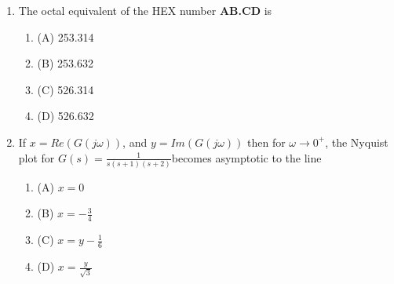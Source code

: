 \documentclass[journal]{IEEEtran}
\numberwithin{equation}{enumi}
\numberwithin{figure}{enumi}
\begin{document}
\begin{enumerate}
\begin{figure}[!ht]
    \caption{}
    \label{fig:15}
    \end{figure}
    \\\\The bus voltage phase angular difference between generator bus X and generator bus Y after the interconnection is
    \begin{multicols}{4}
    \begin{enumerate}
        \item $10^\circ$
        \item $25^\circ$
        \item $-30^\circ$
        \item $30^\circ$
    \end{enumerate}
    \end{multicols}
    \bigskip
    \item The octal equivalent of the HEX number \textbf{AB.CD} is
    \begin{multicols}{4}
    \begin{enumerate}
        \item (A) 253.314
        \item (B) 253.632
        \item (C) 526.314
        \item (D) 526.632
    \end{enumerate}
    \end{multicols}
    \bigskip
    \item If $x = Re(G(j\omega))$, and $y = Im(G(j\omega))$ then for $ \omega \to 0^{+} $, the Nyquist plot for $G(s) = \frac{1}{s(s+1)(s+2)}$becomes asymptotic to the line
    \begin{multicols}{4}
    \begin{enumerate}
        \item (A) $x = 0$
        \item (B) $x = -\frac{3}{4}$
        \item (C) $x = y - \frac{1}{6}$
        \item (D) $x = \frac{y}{\sqrt{3}}$
    \end{enumerate}
    \end{multicols}
    \bigskip

\end{enumerate}
\end{document}
